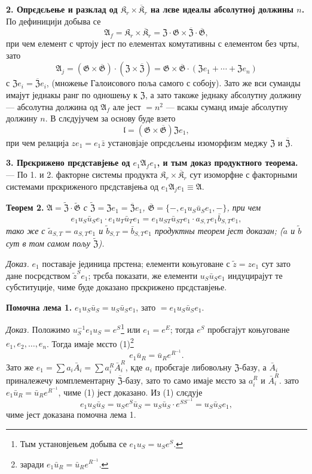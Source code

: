 \documentclass[11pt]{article}
\newcommand{\srcfn}[2]{\footnote{#2}}
\begin{document}
\noindent\textbf{2. Опрєдєљење и разклад од \(\mathfrak K_r\times\overline{\mathfrak K}_r\) на лєве идеалы абсолутној должины \(n\).} По дефиницији добыва се
\[
\mathfrak A_f=\mathfrak K_r\times\overline{\mathfrak K}_r
=\mathfrak Z\cdot\mathfrak G\times\overline{\mathfrak Z}\cdot\overline{\mathfrak G},
\]
при чем елемент с чртоју јест по елементах комутативны с елементом без чрты, зато
\[
\mathfrak A_j
=(\mathfrak G\times\overline{\mathfrak G})\cdot(\mathfrak Z\times\overline{\mathfrak Z})
=\mathfrak G\times\overline{\mathfrak G}\cdot(\mathfrak Ze_1+\cdots+\mathfrak Ze_n)
\]
с \(\mathfrak Ze_i=\overline{\mathfrak Z}e_i\), (множење Галоисового поља самого с собоју). Зато же вси суманды имајут једнакы ранг по одношењу к \(\mathfrak Z\), а зато такоже једнаку абсолутну должину --- абсолутна должина од \(\mathfrak A_f\) але јест \(=n^2\) --- всакы суманд имаје абсолутну должину \(n\). В слєдујучем за основу буде взето
\[
\mathfrak l=(\mathfrak G\times\overline{\mathfrak G})\mathfrak Ze_1,
\]
при чем релација \(ze_1=e_1\bar z\) установјаје опрєдєљены изоморфизм меджу \(\mathfrak Z\) и \(\overline{\mathfrak Z}\).

\noindent\textbf{3. Прєкрижено прєдставјење од \(e_1\mathfrak A_fe_1\), и тым доказ продуктного теорема.} --- По 1. и 2. факторне системы продукта \(\mathfrak K_r\times\overline{\mathfrak K}_r\) сут изоморфне с факторными системами прєкриженого прєдставјења од \(e_1\mathfrak A_je_1\equiv\mathfrak A\).

\noindent\textbf{Теорем 2.} \emph{\(\mathfrak A=\widetilde{\mathfrak Z}\cdot\widetilde{\mathfrak G}\) с \(\widetilde{\mathfrak Z}=\mathfrak Ze_1=\overline{\mathfrak Z}e_1\), \(\overline{\mathfrak G}=\{-,e_1u_S\bar u_Se_1,-\}\), при чем
\[
e_1u_S\bar u_Se_1\cdot e_1u_T\bar u_Te_1
=e_1u_{ST}\bar u_{ST}e_1\cdot a_{S,T}e_1\bar b_{S,T}e_1,
\]
тако же с \(\tilde a_{S,T}=a_{S,T}e_1\) и \(\tilde b_{S,T}=\bar b_{S,T}e_1\) продуктны теорем јест доказан; (\(\tilde a\) и \(\tilde b\) сут в том самом пољу \(\widetilde{\mathfrak Z}\)).}

\noindent\emph{Доказ.} \(e_1\) поставаје јединица прстена; елементи коњуговане с \(\tilde z=ze_1\) сут зато дане посрєдством \(\tilde z^Se_1\); трєба показати, же елементи \(u_S\bar u_Se_1\) индуцирајут те субституције, чиме буде доказано прєкрижено прєдставјење.

\noindent\textbf{Помочна лема 1.} \(e_1u_S\bar u_S=u_S\bar u_Se_1\), зато \(=e_1u_S\bar u_Se_1\).

\noindent\emph{Доказ.} Положимо \(u_S^{-1}e_1u_S=e^S\)\srcfn{1}{Тым установјењем добыва се \(e_1u_S=u_Se^S\).} или \(e_1=e^E\); тогда \(e^S\) пробєгајут коњуговане \(e_1,e_2,\ldots,e_n\). Тогда имаје мєсто (1)\srcfn{2}{заради \(e_1\bar u_R=\bar u_Re^{R^{-1}}\).}
\[
e_1\bar u_R=\bar u_Re^{R^{-1}}.
\]
Зато же \(e_1=\sum a_i\bar A_i=\sum a_i^R\bar A_i^R\), кде \(a_i\) пробєгаје либовољну \(\mathfrak Z\)-базу, а \(\bar A_i\) приналежечу комплементарну \(\overline{\mathfrak Z}\)-базу, зато то само имаје мєсто за \(a_i^R\) и \(\bar A_i^R\). зато \(e_1\bar u_R=\bar u_Re^{R^{-1}}\), чиме (1) јест доказано. Из (1) слєдује
\[
e_1u_S\bar u_S=u_Se^S\bar u_S=u_S\bar u_S\cdot e^{SS^{-1}}=u_S\bar u_Se_1,
\]
чиме јест доказана помочна лема 1.
\end{document}
